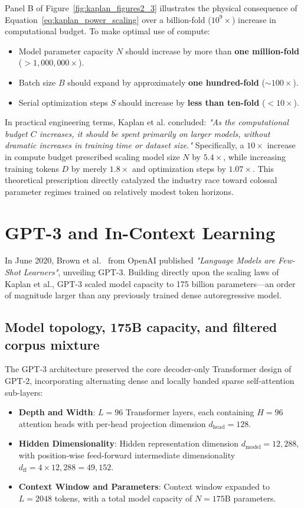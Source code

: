 \documentclass[../../../main.tex]{subfiles}
\begin{document}
Panel B of Figure~\ref{fig:kaplan_figures2_3} illustrates the physical consequence of Equation~\eqref{eq:kaplan_power_scaling} over a billion-fold ($10^9\times$) increase in computational budget. To make optimal use of compute:
\begin{itemize}
    \item Model parameter capacity $N$ should increase by more than \textbf{one million-fold} ($> 1,000,000\times$).
    \item Batch size $B$ should expand by approximately \textbf{one hundred-fold} ($\sim 100\times$).
    \item Serial optimization steps $S$ should increase by \textbf{less than ten-fold} ($< 10\times$).
\end{itemize}

In practical engineering terms, Kaplan et al. concluded: \emph{"As the computational budget $C$ increases, it should be spent primarily on larger models, without dramatic increases in training time or dataset size."} Specifically, a $10\times$ increase in compute budget prescribed scaling model size $N$ by $5.4\times$, while increasing training tokens $D$ by merely $1.8\times$ and optimization steps by $1.07\times$. This theoretical prescription directly catalyzed the industry race toward colossal parameter regimes trained on relatively modest token horizons.


\section{GPT-3 and In-Context Learning}
\label{sec:gpt3_in_context_learning}

In June 2020, Brown et al.~\cite{brown2020} from OpenAI published \emph{"Language Models are Few-Shot Learners"}, unveiling GPT-3. Building directly upon the scaling laws of Kaplan et al., GPT-3 scaled model capacity to 175 billion parameters—an order of magnitude larger than any previously trained dense autoregressive model.


\subsection{Model topology, 175B capacity, and filtered corpus mixture}
\label{subsec:gpt3_setup}

The GPT-3 architecture preserved the core decoder-only Transformer design of GPT-2, incorporating alternating dense and locally banded sparse self-attention sub-layers:
\begin{itemize}
    \item \textbf{Depth and Width}: $L = 96$ Transformer layers, each containing $H = 96$ attention heads with per-head projection dimension $d_{\text{head}} = 128$.
    \item \textbf{Hidden Dimensionality}: Hidden representation dimension $d_{\text{model}} = 12,288$, with position-wise feed-forward intermediate dimensionality $d_{\text{ff}} = 4 \times 12,288 = 49,152$.
    \item \textbf{Context Window and Parameters}: Context window expanded to $L = 2048$ tokens, with a total model capacity of $N = 175\text{B}$ parameters.
\end{itemize}
\end{document}
